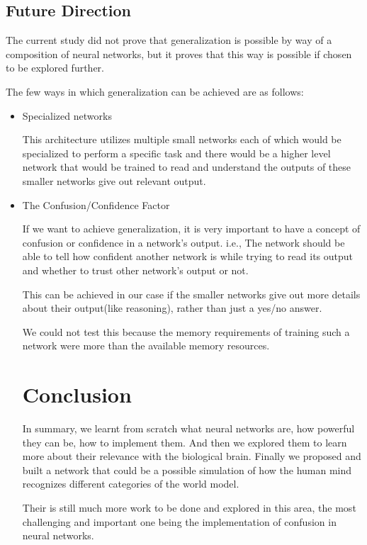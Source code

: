 \documentclass[12pt]{acmart}
\begin{document}
\subsection{Future Direction}
\label{Future Direction}
The current study did not prove that generalization is possible by way of a composition of neural networks, but it proves that this way is possible if chosen to be explored further.

The few ways in which generalization can be achieved are as follows:
\begin{itemize}
    \item Specialized networks
    
    This architecture utilizes multiple small networks each of which would be specialized to perform a specific task and there would be a higher level network that would be trained to read and understand the outputs of these smaller networks give out relevant output.
    \item The Confusion/Confidence Factor
    
    If we want to achieve generalization, it is very important to have a concept of confusion or confidence in a network's output. i.e., The network should be able to tell how confident another network is while trying to read its output and whether to trust other network's output or not.
    
    This can be achieved in our case if the smaller networks give out more details about their output(like reasoning), rather than just a yes/no answer.
    
    We could not test this because the memory requirements of training such a network were more than the available memory resources.

\section{Conclusion}
In summary, we learnt from scratch what neural networks are, how powerful they can be, how to implement them. And then we explored them to learn more about their relevance with the biological brain. Finally we proposed and built a network that could be a possible simulation of how the human mind recognizes different categories of the world model.

Their is still much more work to be done and explored in this area, the most challenging and important one being the implementation of confusion in neural networks.

\end{itemize}
\end{document}
